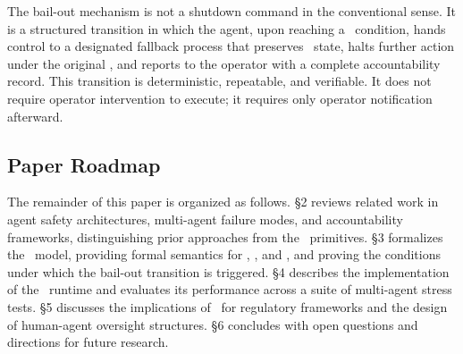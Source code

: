 The bail-out mechanism is not a shutdown command in the conventional sense. It is a structured transition in which the agent, upon reaching a \bounds\ condition, hands control to a designated fallback process that preserves \fact\ state, halts further action under the original \purpose, and reports to the operator with a complete accountability record. This transition is deterministic, repeatable, and verifiable. It does not require operator intervention to execute; it requires only operator notification afterward.

\subsection{Paper Roadmap}

The remainder of this paper is organized as follows. \S2 reviews related work in agent safety architectures, multi-agent failure modes, and accountability frameworks, distinguishing prior approaches from the \bxthree\ primitives. \S3 formalizes the \bxthree\ model, providing formal semantics for \purpose, \bounds, and \fact, and proving the conditions under which the bail-out transition is triggered. \S4 describes the implementation of the \bxthree\ runtime and evaluates its performance across a suite of multi-agent stress tests. \S5 discusses the implications of \bxthree\ for regulatory frameworks and the design of human-agent oversight structures. \S6 concludes with open questions and directions for future research.